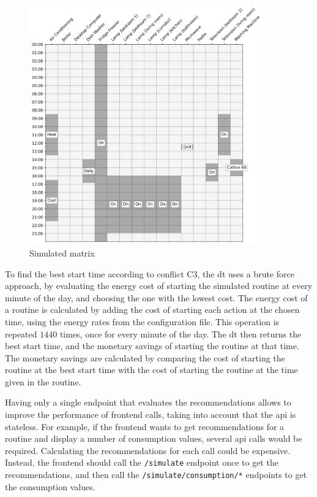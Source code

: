 \begin{figure}
    \centering
    \includegraphics[width=0.9\textwidth]{images/simulated_matrix.png}
    \caption{Simulated matrix}
    \label{fig:simulated_consumption_matrix}
\end{figure}

To find the best start time according to conflict C3, the \acrshort{dt} uses a brute force approach, by evaluating the energy cost of starting the simulated routine at every minute of the day, and choosing the one with the lowest cost. The energy cost of a routine is calculated by adding the cost of starting each action at the chosen time, using the energy rates from the configuration file. This operation is repeated $1440$ times, once for every minute of the day. The \acrshort{dt} then returns the best start time, and the monetary savings of starting the routine at that time. The monetary savings are calculated by comparing the cost of starting the routine at the best start time with the cost of starting the routine at the time given in the routine.

Having only a single endpoint that evaluates the recommendations allows to improve the performance of frontend calls, taking into account that the \acrshort{api} is stateless. For example, if the frontend wants to get recommendations for a routine and display a number of consumption values, several \acrshort{api} calls would be required. Calculating the recommendations for each call could be expensive. Instead, the frontend should call the \texttt{/simulate} endpoint once to get the recommendations, and then call the \texttt{/simulate/consumption/*} endpoints to get the consumption values.

